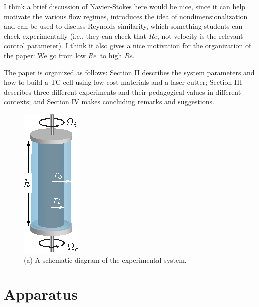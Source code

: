 \documentclass[%
reprint,
 amsmath,amssymb,
 aps,
prb,
floatfix,
longbibliography,
notitlepage
]{revtex4-1}
\newcommand{\DB}[1]{{\color{red}#1}} %
\newcommand{\ReN}{\ensuremath{Re}} %
\begin{document}
\DB{I think a brief discussion of Navier-Stokes here would be nice, since it can help motivate the various flow regimes, introduces the idea of nondimensionalization and can be used to discuss Reynolds similarity, which something students can check experimentally (i.e., they can check that \ReN, not velocity is the relevant control parameter). I think it also gives a nice motivation for the organization of the paper: We go from low \ReN\ to high \ReN.}

The paper is organized as follows: Section II describes the system parameters and how to build a TC cell using low-cost materials and a laser cutter; Section III describes three different experiments and their pedagogical values in different contexts; and Section IV makes concluding remarks and suggestions.


\begin{figure}[ht]
  \centering
    \includegraphics[width=.15\columnwidth]{Figures/1_Apparatus.eps}
    \caption{\label{fig:schematic}(a) A schematic diagram of the experimental system.}
\end{figure}

\section{Apparatus}
\end{document}
